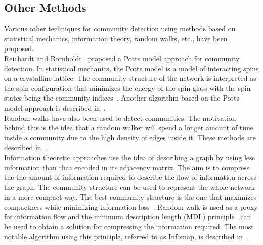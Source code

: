 \begin{spacing}{1.5}
\subsection{Other Methods}
Various other techniques for community detection using methods based on statistical mechanics, information theory, random walks, etc., have been proposed.\\
\indent Reichardt and Bornholdt~\cite{PhysRevLett.93.218701} proposed a Potts model approach for community detection. In statistical mechanics, the Potts model is a model of interacting spins on a crystalline lattice. The community structure of the network is interpreted as the spin configuration that minimizes the energy of the spin glass with the spin states being the community indices~\cite{PhysRevLett.93.218701}. Another algorithm based on the Potts model approach is described in~\cite{PhysRevE.81.046114}.\\
\indent Random walks have also been used to detect communities. The motivation behind this is the idea that a random walker will spend a longer amount of time inside a community due to the high density of edges inside it. These methods are described in~\cite{PhysRevE.67.041908, ponslatapy05, vandongen00}. \\
\indent Information theoretic approaches use the idea of describing a graph by using less information than that encoded in its adjacency matrix. The aim is to compress the the amount of information required to describe the flow of information across the graph. The community structure can be used to represent the whole network in a more compact way. The best community structure is the one that maximizes compactness while minimizing information loss~\cite{1742-5468-2012-08-P08001}. Random walk is used as a proxy for information flow and the minimum description length (MDL) principle~\cite{Rissanen1978465} can be used to obtain a solution for compressing the information required. The most notable algorithm using this principle, referred to as Infomap, is described in~\cite{Rosvall29012008}.\\

\end{spacing}
